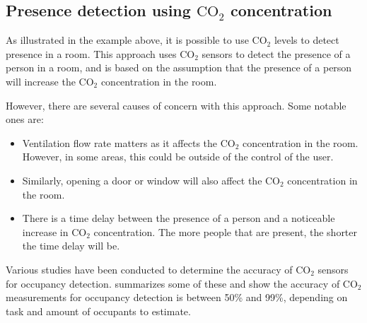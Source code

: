 \subsection{Presence detection using $\text{CO}_{2}$ concentration}\label{sec:presence_env_co2}
As illustrated in the example above, it is possible to use $\text{CO}_{2}$ levels to detect presence in a room.
This approach uses $\text{CO}_{2}$ sensors to detect the presence of a person in a room, and is based on the assumption that the presence of a person will increase the $\text{CO}_{2}$ concentration in the room.\cite{gruberCO2SensorsOccupancy2014}

However, there are several causes of concern with this approach. Some notable ones are:
\begin{itemize}
    \item Ventilation flow rate matters as it affects the $\text{CO}_{2}$ concentration in the room. However, in some areas, this could be outside of the control of the user.
    \item Similarly, opening a door or window will also affect the $\text{CO}_{2}$ concentration in the room.
    \item There is a time delay between the presence of a person and a noticeable increase in $\text{CO}_{2}$ concentration. The more people that are present, the shorter the time delay will be.
\end{itemize}
\cite{gruberCO2SensorsOccupancy2014,longoAccurateOccupancyEstimation2019}

Various studies have been conducted to determine the accuracy of $\text{CO}_{2}$ sensors for occupancy detection. \citeauthor{longoAccurateOccupancyEstimation2019}\cite{longoAccurateOccupancyEstimation2019} summarizes some of these and show the accuracy of $\text{CO}_{2}$ measurements for occupancy detection is between 50\% and 99\%, depending on task and amount of occupants to estimate.